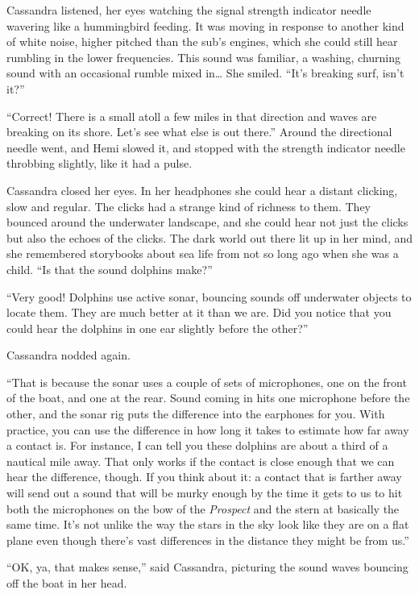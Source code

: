 \documentclass[
]{scrbook}
\begin{document}
Cassandra listened, her eyes watching the signal strength indicator
needle wavering like a hummingbird feeding. It was moving in response to
another kind of white noise, higher pitched than the sub's engines,
which she could still hear rumbling in the lower frequencies. This sound
was familiar, a washing, churning sound with an occasional rumble mixed
in\ldots{} She smiled. ``It's breaking surf, isn't it?''

``Correct! There is a small atoll a few miles in that direction and
waves are breaking on its shore. Let's see what else is out there.''
Around the directional needle went, and Hemi slowed it, and stopped with
the strength indicator needle throbbing slightly, like it had a pulse.

Cassandra closed her eyes. In her headphones she could hear a distant
clicking, slow and regular. The clicks had a strange kind of richness to
them. They bounced around the underwater landscape, and she could hear
not just the clicks but also the echoes of the clicks. The dark world
out there lit up in her mind, and she remembered storybooks about sea
life from not so long ago when she was a child. ``Is that the sound
dolphins make?''

``Very good! Dolphins use active sonar, bouncing sounds off underwater
objects to locate them. They are much better at it than we are. Did you
notice that you could hear the dolphins in one ear slightly before the
other?''

Cassandra nodded again.

``That is because the sonar uses a couple of sets of microphones, one on
the front of the boat, and one at the rear. Sound coming in hits one
microphone before the other, and the sonar rig puts the difference into
the earphones for you. With practice, you can use the difference in how
long it takes to estimate how far away a contact is. For instance, I can
tell you these dolphins are about a third of a nautical mile away. That
only works if the contact is close enough that we can hear the
difference, though. If you think about it: a contact that is farther
away will send out a sound that will be murky enough by the time it gets
to us to hit both the microphones on the bow of the \emph{Prospect} and
the stern at basically the same time. It's not unlike the way the stars
in the sky look like they are on a flat plane even though there's vast
differences in the distance they might be from us.''

``OK, ya, that makes sense,'' said Cassandra, picturing the sound waves
bouncing off the boat in her head.
\end{document}
